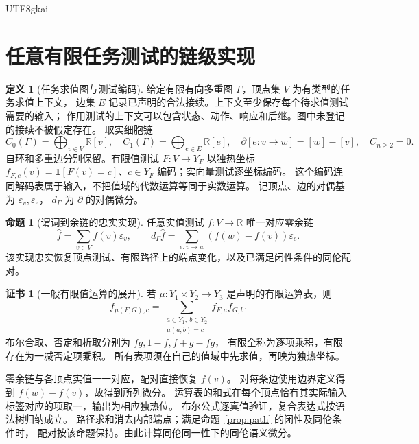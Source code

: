 \documentclass[12pt]{report}
\makeatletter
\theoremstyle{definition}
\newtheorem{definition}{定义}[chapter]
\newtheorem{proposition}{命题}[chapter]
\newtheorem{Certificate}{证书}[chapter]
\renewenvironment{proof}[1][\proofname]{\par
  \pushQED{\qed}\normalfont
  \topsep6\p@\@plus6\p@\relax
  \trivlist
  \item[\hskip\labelsep\normalfont #1\@addpunct{.}]\ignorespaces
}{
  \popQED\endtrivlist\@endpefalse
}
\newcommand{\RR}{\mathbb R}
\makeatother
\begin{document}
\begin{CJK*}{UTF8}{gkai}
\section{任意有限任务测试的链级实现}
\label{sec:predicate-realization}
\begin{definition}[任务求值图与测试编码]
\label{def:predicate-table}
给定有限有向多重图 \(\Gamma\)，顶点集 \(V\) 为有类型的任务求值上下文，
边集 \(E\) 记录已声明的合法接续。上下文至少保存每个待求值测试需要的输入；
作用测试的上下文可以包含状态、动作、响应和后继。图中未登记的接续不被假定存在。
取实细胞链
\[
C_0(\Gamma)=\bigoplus_{v\in V}\RR[v],\quad
C_1(\Gamma)=\bigoplus_{e\in E}\RR[e],\quad
\partial[e:v\to w]=[w]-[v],\quad C_{n\ge2}=0.
\]
自环和多重边分别保留。有限值测试 \(F:V\to Y_F\) 以独热坐标
\(f_{F,c}(v)=\mathbf1[F(v)=c]\)、\(c\in Y_F\) 编码；实向量测试逐坐标编码。
这个编码连同解码表属于输入，不把值域的代数运算等同于实数运算。
记顶点、边的对偶基为 \(\varepsilon_v,\varepsilon_e\)，
\(d_\Gamma\) 为 \(\partial\) 的对偶微分。
\end{definition}
\begin{proposition}[谓词到余链的忠实实现]
\label{prop:predicate-cochain}
任意实值测试 \(f:V\to\RR\) 唯一对应零余链
\[
\widehat f=\sum_{v\in V}f(v)\varepsilon_v,\qquad
d_\Gamma\widehat f
=\sum_{e:v\to w}(f(w)-f(v))\varepsilon_e.
\]
该实现忠实恢复顶点测试、有限路径上的端点变化，以及已满足闭性条件的同伦配对。
\end{proposition}
\begin{Certificate}[一般有限值运算的展开]
若 \(\mu:Y_1\times Y_2\to Y_3\) 是声明的有限运算表，则
\[
f_{\mu(F,G),c}
=\sum_{\substack{a\in Y_1,\ b\in Y_2\\\mu(a,b)=c}}f_{F,a}f_{G,b}.
\]
布尔合取、否定和析取分别为 \(fg,1-f,f+g-fg\)，
有限全称为逐项乘积，有限存在为一减否定项乘积。
所有表项须在自己的值域中先求值，再映为独热坐标。
\end{Certificate}
\begin{proof}
零余链与各顶点实值一一对应，配对直接恢复 \(f(v)\)。
对每条边使用边界定义得到 \(f(w)-f(v)\)，故得到所列微分。
运算表的和式在每个顶点恰有其实际输入标签对应的项取一，输出为相应独热位。
布尔公式逐真值验证，复合表达式按语法树归纳成立。
路径求和消去内部端点；满足命题~\ref{prop:path} 的闭性及同伦条件时，
配对按该命题保持。由此计算同伦同一性下的同伦语义微分。
\end{proof}


\end{CJK*}
\end{document}

